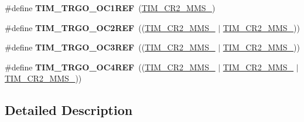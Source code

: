 \begin{DoxyCompactItemize}
\#define {\bfseries T\+I\+M\+\_\+\+T\+R\+G\+O\+\_\+\+O\+C1\+R\+EF}~(\mbox{\hyperlink{group___peripheral___registers___bits___definition_gacb74a815afdd856d51cfcf1ddf3fce6a}{T\+I\+M\+\_\+\+C\+R2\+\_\+\+M\+M\+S\+\_}})
\item 
\mbox{\label{group___t_i_m___master___mode___selection_gaaedc4b3f4c5c3c8b45a2cf1b73e33c0a}} 
\#define {\bfseries T\+I\+M\+\_\+\+T\+R\+G\+O\+\_\+\+O\+C2\+R\+EF}~((\mbox{\hyperlink{group___peripheral___registers___bits___definition_gacb74a815afdd856d51cfcf1ddf3fce6a}{T\+I\+M\+\_\+\+C\+R2\+\_\+\+M\+M\+S\+\_}} $\vert$ \mbox{\hyperlink{group___peripheral___registers___bits___definition_gaf3e55308e84106d6501201e66bd46ab6}{T\+I\+M\+\_\+\+C\+R2\+\_\+\+M\+M\+S\+\_}}))
\item 
\mbox{\label{group___t_i_m___master___mode___selection_ga4bc4791f8b9560950d30078b96d08f55}} 
\#define {\bfseries T\+I\+M\+\_\+\+T\+R\+G\+O\+\_\+\+O\+C3\+R\+EF}~((\mbox{\hyperlink{group___peripheral___registers___bits___definition_gacb74a815afdd856d51cfcf1ddf3fce6a}{T\+I\+M\+\_\+\+C\+R2\+\_\+\+M\+M\+S\+\_}} $\vert$ \mbox{\hyperlink{group___peripheral___registers___bits___definition_ga4b1036929b0a4ba5bd5cced9b8e0f4c3}{T\+I\+M\+\_\+\+C\+R2\+\_\+\+M\+M\+S\+\_}}))
\item 
\mbox{\label{group___t_i_m___master___mode___selection_ga7fe6228adec5d1b6f0a8ed8da111db4d}} 
\#define {\bfseries T\+I\+M\+\_\+\+T\+R\+G\+O\+\_\+\+O\+C4\+R\+EF}~((\mbox{\hyperlink{group___peripheral___registers___bits___definition_gacb74a815afdd856d51cfcf1ddf3fce6a}{T\+I\+M\+\_\+\+C\+R2\+\_\+\+M\+M\+S\+\_}} $\vert$ \mbox{\hyperlink{group___peripheral___registers___bits___definition_ga4b1036929b0a4ba5bd5cced9b8e0f4c3}{T\+I\+M\+\_\+\+C\+R2\+\_\+\+M\+M\+S\+\_}} $\vert$ \mbox{\hyperlink{group___peripheral___registers___bits___definition_gaf3e55308e84106d6501201e66bd46ab6}{T\+I\+M\+\_\+\+C\+R2\+\_\+\+M\+M\+S\+\_}}))
\end{DoxyCompactItemize}


\subsection{Detailed Description}
